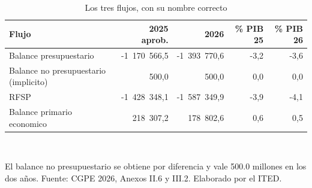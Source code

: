 \begin{table}[htbp]
\centering
\scriptsize
\caption{Los tres flujos, con su nombre correcto}
\label{cua:C13_1}
\begin{tabular}{p{6.0cm}rrrr}
\toprule
\textbf{Flujo} & \textbf{2025 aprob.} & \textbf{2026} & \textbf{\% PIB 25} & \textbf{\% PIB 26} \\
\midrule
Balance presupuestario & -1 170 566,5 & -1 393 770,6 & -3,2 & -3,6 \\
Balance no presupuestario (implicito) & 500,0 & 500,0 & 0,0 & 0,0 \\
RFSP & -1 428 348,1 & -1 587 349,9 & -3,9 & -4,1 \\
Balance primario economico & 218 307,2 & 178 802,6 & 0,6 & 0,5 \\
\bottomrule
\end{tabular}
\\[2pt]\begin{minipage}{0.92\textwidth}\scriptsize El balance no presupuestario se obtiene por diferencia y vale 500.0 millones en los dos años. Fuente: CGPE 2026, Anexos II.6 y III.2. Elaborado por el ITED.\end{minipage}
\end{table}
